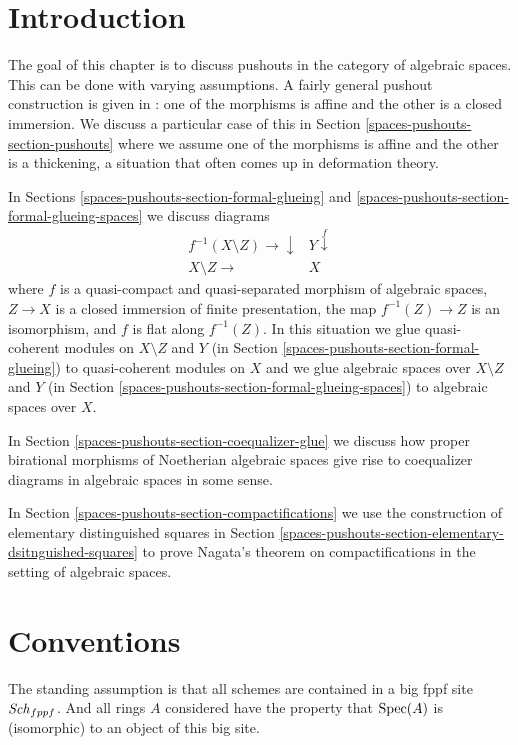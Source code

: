 \section{Introduction}
\label{spaces-pushouts-section-introduction}
The goal of this chapter is to discuss pushouts in the category of
algebraic spaces. This can be done with varying assumptions.
A fairly general pushout construction is given in \cite{Temkin-Tyomkin}:
one of the morphisms is affine and the other is a closed immersion.
We discuss a particular case of this in Section \ref{spaces-pushouts-section-pushouts}
where we assume one of the morphisms is affine and the other is a
thickening, a situation that often comes up in deformation theory.

\medskip\noindent
In Sections \ref{spaces-pushouts-section-formal-glueing} and
\ref{spaces-pushouts-section-formal-glueing-spaces} we discuss diagrams
$$
\begin{array}{cc}f^{-1}(X \setminus Z) \longrightarrow\downarrow & Y \overset{f}{\downarrow} \\ X \setminus Z \longrightarrow & X\end{array}
$$
where $f$ is a quasi-compact and quasi-separated morphism of
algebraic spaces, $Z \to X$ is a closed immersion of finite presentation,
the map $f^{-1}(Z) \to Z$ is an isomorphism, and
$f$ is flat along $f^{-1}(Z)$. In this situation we glue
quasi-coherent modules on $X \setminus Z$ and $Y$
(in Section \ref{spaces-pushouts-section-formal-glueing}) to quasi-coherent modules on $X$
and we glue algebraic spaces over $X \setminus Z$ and $Y$
(in Section \ref{spaces-pushouts-section-formal-glueing-spaces}) to algebraic spaces over $X$.

\medskip\noindent
In Section \ref{spaces-pushouts-section-coequalizer-glue} we discuss how proper birational
morphisms of Noetherian algebraic spaces give rise to coequalizer diagrams
in algebraic spaces in some sense.

\medskip\noindent
In Section \ref{spaces-pushouts-section-compactifications} we use the construction
of elementary distinguished squares
in Section \ref{spaces-pushouts-section-elementary-dsitnguished-squares}
to prove Nagata's theorem on compactifications in the setting
of algebraic spaces.

\section{Conventions}
\label{spaces-pushouts-section-conventions}
The standing assumption is that all schemes are contained in
a big fppf site $\mathit{Sch}_{fppf}$. And all rings $A$ considered
have the property that $\operatorname{Spec}(A)$ is (isomorphic) to an
object of this big site.

